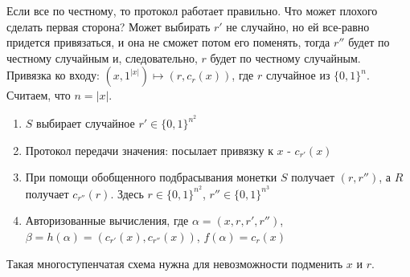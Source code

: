 \documentclass[a4paper]{article}
\theoremstyle{definition}
\theoremstyle{plain}
\begin{document}
\noindent Если все по честному, то протокол работает правильно. Что может плохого сделать
первая сторона? Может выбирать $r'$ не случайно, но ей все-равно придется привязаться, и
она не сможет потом его поменять, тогда $r''$ будет по честному случайным и, следовательно, 
$r$ будет по честному случайным.~\\

\noindent Привязка ко входу: $(x, 1^{|x|}) \mapsto (r, c_r(x))$, где $r$ случайное из $\{0, 1\}^n$.~\\

\noindent Считаем, что $n = |x|$.

\begin{enumerate}
	\item $S$ выбирает случайное $r' \in \{0, 1\}^{n^2}$
	\item Протокол передачи значения: посылает привязку к $x$ - $c_{r'}(x)$
	\item При помощи обобщенного подбрасывания монетки $S$ получает $(r, r'')$, а $R$
		получает $c_{r''}(r)$. Здесь $r \in \{0, 1\}^{n^2}$, $r'' \in \{0, 1\}^{n^3}$
	\item Авторизованные вычисления, где $\alpha = (x, r, r', r'')$,
		$\beta = h(\alpha) = (c_{r'}(x), c_{r''}(x))$, $f(\alpha) = c_r(x)$
\end{enumerate}

\noindent Такая многоступенчатая схема нужна для невозможности подменить $x$ и $r$.~\\
\end{document}
